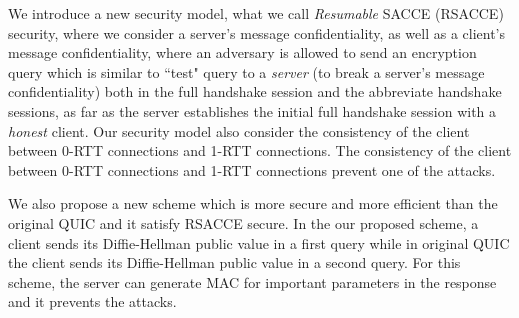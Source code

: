 We introduce a new
security model, what we call \textit{Resumable} SACCE
(RSACCE) security, where we consider a server's message
confidentiality, as well as a client's message
confidentiality, where an adversary is allowed to send
an encryption query which is similar to ``test" query to a \textit{server} (to break a
server's message confidentiality) both in the full
handshake session and the abbreviate handshake sessions,
as far as the server establishes the initial full
handshake session with a \textit{honest} client.
Our security model also consider the consistency of the client between
0-RTT connections and 1-RTT connections.
The consistency of the client between 0-RTT connections
and 1-RTT connections prevent one of the attacks.

We also propose a new scheme which is more secure and more efficient
than the original QUIC and it satisfy RSACCE secure.
In the our proposed scheme, a client sends its Diffie-Hellman public value in
a first query while in original QUIC the client sends its Diffie-Hellman
public value in a second query.
For this scheme, the server can generate MAC for important parameters in the
response and it prevents the attacks.
